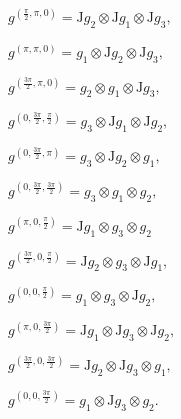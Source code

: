 \documentclass[fleqn,a4paper,oneside,openany]{book}
\begin{document}
$g^{(\frac{\pi}{2},\pi,0)}= \mathrm{J}g_{2}\otimes \mathrm{J}g_{1}\otimes \mathrm{J}g_{3},$

$g^{(\pi,\pi,0)}= g_{1}\otimes \mathrm{J}g_{2}\otimes \mathrm{J}g_{3},$

$g^{(\frac{3\pi}{2},\pi,0)}= g_{2}\otimes g_{1}\otimes \mathrm{J}g_{3},$

$g^{(0,\frac{3\pi}{2},\frac{\pi}{2})}= g_{3}\otimes \mathrm{J}g_{1}\otimes \mathrm{J}g_{2},$

$g^{(0,\frac{3\pi}{2},\pi)}= g_{3}\otimes \mathrm{J}g_{2}\otimes g_{1},$

$g^{(0,\frac{3\pi}{2},\frac{3\pi}{2})}= g_{3}\otimes g_{1}\otimes g_{2},$

$g^{(\pi,0,\frac{\pi}{2})}= \mathrm{J}g_{1}\otimes g_{3}\otimes g_{2}$

$g^{(\frac{3\pi}{2},0,\frac{\pi}{2})}= \mathrm{J}g_{2}\otimes g_{3}\otimes \mathrm{J}g_{1},$

$g^{(0,0,\frac{\pi}{2})}= g_{1}\otimes g_{3}\otimes \mathrm{J}g_{2},$

$g^{(\pi,0,\frac{3\pi}{2})}= \mathrm{J}g_{1}\otimes \mathrm{J}g_{3}\otimes \mathrm{J}g_{2},$

$g^{(\frac{3\pi}{2},0,\frac{3\pi}{2})}= \mathrm{J}g_{2}\otimes \mathrm{J}g_{3}\otimes g_{1},$

$g^{(0,0,\frac{3\pi}{2})}= g_{1}\otimes \mathrm{J}g_{3}\otimes g_{2}.$
\end{document}
